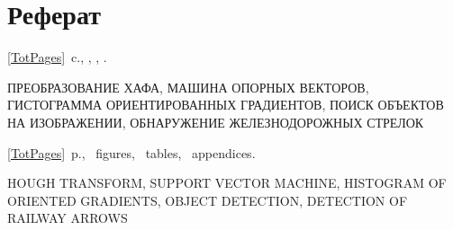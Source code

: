 \chapter*[Count-me]{Реферат} %
\thispagestyle{empty}%
%
%



\ref*{TotPages}~c.,
,
,
.  


{\noindent\MakeUppercase{Преобразование Хафа, Машина опорных векторов, Гистограмма ориентированных градиентов, Поиск объектов на изображении, Обнаружение железнодорожных стрелок}} %

\abstractRu %




\printTheAbstract %


\ref*{TotPages}~p.,
~figures, 
~tables,
~appendices.


{\noindent\MakeUppercase{Hough transform, Support Vector Machine, Histogram of oriented gradients, Object detection, Detection of railway arrows}} %
	
\abstractEn %

	


\thispagestyle{empty}
%
